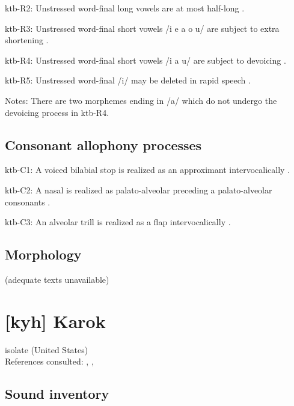 {\begin{appendixdesc}
\item[ktb-R2:] Unstressed word-final long vowels are at most half-long \citep[19]{Treis2008}.

\item[ktb-R3:] Unstressed word-final short vowels /i e a o u/ are subject to extra shortening \citep[20]{Treis2008}.

\item[ktb-R4:] Unstressed word-final short vowels /i a u/ are subject to devoicing \citep[20]{Treis2008}.

\item[ktb-R5:] Unstressed word-final /i/ may be deleted in rapid speech \citep[20]{Treis2008}.

\item[Notes:] There are two morphemes ending in /a/ which do not undergo the devoicing process in ktb-R4.
\end{appendixdesc}
\subsection*{Consonant allophony processes}
\begin{appendixdesc}

\item[ktb-C1:] A voiced bilabial stop is realized as an approximant intervocalically \citep[24]{Treis2008}.

\item[ktb-C2:] A nasal is realized as palato-alveolar preceding a palato-alveolar consonants \citep[34]{Treis2008}.

\item[ktb-C3:] An alveolar trill is realized as a flap intervocalically \citep[35]{Treis2008}.
\end{appendixdesc}
\subsection*{Morphology}

(adequate texts unavailable)

\section*{[kyh] Karok}  %
isolate (United States)\medskip\\
References consulted: \citet{AnguloFreeland1971}, \citet{Bright1957}, \citet{Sandy2014}

\subsection*{Sound inventory}
\begin{appendixdesc}


\end{appendixdesc}}
